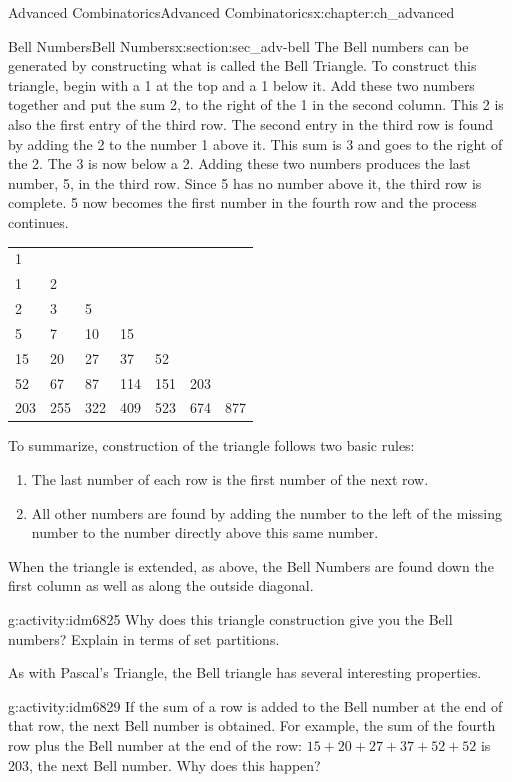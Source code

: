 \documentclass[oneside,10pt,]{book}
\numberwithin{equation}{chapter}
\begin{document}
\begin{chapterptx}{Advanced Combinatorics}{}{Advanced Combinatorics}{}{}{x:chapter:ch_advanced}
\begin{sectionptx}{Bell Numbers}{}{Bell Numbers}{}{}{x:section:sec_adv-bell}
The Bell numbers can be generated by constructing what is called the Bell Triangle. To construct this triangle, begin with a 1 at the top and a 1 below it. Add these two numbers together and put the sum 2, to the right of the 1 in the second column. This 2 is also the first entry of the third row. The second entry in the third row is found by adding the 2 to the number 1 above it. This sum is 3 and goes to the right of the 2. The 3 is now below a 2. Adding these two numbers produces the last number, 5, in the third row. Since 5 has no number above it, the third row is complete. 5 now becomes the first number in the fourth row and the process continues.%
\begin{sidebyside}{1}{0.15}{0.15}{0}%
\begin{sbspanel}{0.7}%
{\centering%
\begin{tabular}{lllllll}
1&&&&&&\tabularnewline[0pt]
1&2&&&&&\tabularnewline[0pt]
2&3&5&&&&\tabularnewline[0pt]
5&7&10&15&&&\tabularnewline[0pt]
15&20&27&37&52&&\tabularnewline[0pt]
52&67&87&114&151&203&\tabularnewline[0pt]
203&255&322&409&523&674&877
\end{tabular}
\par}
\end{sbspanel}%
\end{sidebyside}%
\par
To summarize, construction of the triangle follows two basic rules:%
\begin{enumerate}
\item{}The last number of each row is the first number of the next row.%
\item{}All other numbers are found by adding the number to the left of the missing number to the number directly above this same number.%
\end{enumerate}
When the triangle is extended, as above, the Bell Numbers are found down the first column as well as along the outside diagonal.%
\begin{activity}{}{g:activity:idm6825}%
Why does this triangle construction give you the Bell numbers?  Explain in terms of set partitions.%
\end{activity}
As with Pascal's Triangle, the Bell triangle has several interesting properties.%
\begin{activity}{}{g:activity:idm6829}%
If the sum of a row is added to the Bell number at the end of that row, the next Bell number is obtained. For example, the sum of the fourth row plus the Bell number at the end of the row: \(15 + 20 + 27 + 37 + 52 + 52\) is 203, the next Bell number.  Why does this happen?%

\end{activity}
\end{sectionptx}
\end{chapterptx}
\end{document}
